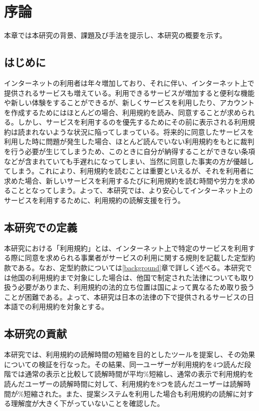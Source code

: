 \chapter{序論}
\label{introduction}

本章では本研究の背景、課題及び手法を提示し、本研究の概要を示す。

\section{はじめに}
\label{introduction:background}
インターネットの利用者は年々増加しており、それに伴い、インターネット上で提供されるサービスも増えている。利用できるサービスが増加すると便利な機能や新しい体験をすることができるが、新しくサービスを利用したり、アカウントを作成するためにはほとんどの場合、利用規約を読み、同意することが求められる。しかし、サービスを利用するのを優先するためにその前に表示される利用規約は読まれないような状況に陥ってしまっている。将来的に同意したサービスを利用した時に問題が発生した場合、ほとんど読んでいない利用規約をもとに裁判を行う必要が生じてしまうため、このときに自分が納得することができない条項などが含まれていても手遅れになってしまい、当然に同意した事実の方が優越してしまう。これにより、利用規約を読むことは重要といえるが、それを利用者に求めた場合、新しいサービスを利用するたびに利用規約を読む時間や労力を求めることとなってしまう。よって、本研究では、より安心してインターネット上のサービスを利用するために、利用規約の読解支援を行う。

\section{本研究での定義}
本研究における「利用規約」とは、インターネット上で特定のサービスを利用する際に同意を求められる事業者がサービスの利用に関する規則を記載した定型約款である。なお、定型約款については\ref{background}章で詳しく述べる。本研究では他国の利用規約まで対象にした場合は、他国で制定された法律についても取り扱う必要がありまた、利用規約の法的立ち位置は国によって異なるため取り扱うことが困難である。よって、本研究は日本の法律の下で提供されるサービスの日本語での利用規約を対象とする。

\section{本研究の貢献}
本研究では、利用規約の読解時間の短縮を目的としたツールを提案し、その効果についての検証を行なった。その結果、同一ユーザーが利用規約を4つ読んだ段階では通常の表示と比較して読解時間が平均\%短縮し、通常の表示で利用規約を読んだユーザーの読解時間に対して、利用規約を8つを読んだユーザーは読解時間が\%短縮された。また、提案システムを利用した場合も利用規約の読解に対する理解度が大きく下がっていないことを確認した。


